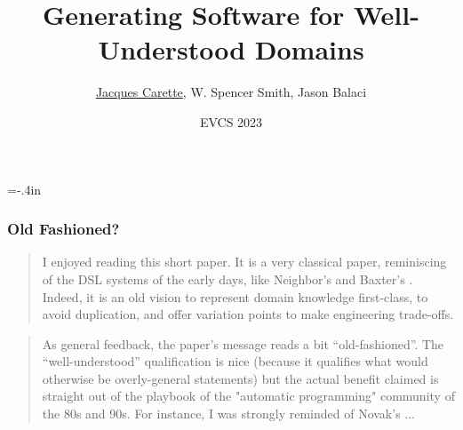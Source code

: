 \documentclass[usenames,dvipsnames,10pt]{beamer}
\title{\textbf{Generating Software for Well-Understood Domains}}
\author{\underline{Jacques Carette}, W. Spencer Smith, Jason Balaci}
\institute[McMaster University]
{
  Computing and Software Department\\
  McMaster University
}
\date[EVCS 2023] %
{EVCS 2023}
\newcommand{\name}[1]{{\color{blue}{#1}}}
\begin{document}
\hoffset=-.4in %
\begin{frame}[plain]


\titlepage

\end{frame}
\hoffset=0in %

\begin{frame}

\frametitle{Old Fashioned?}

\blockquote[][\\ \hfill-- \textbf{Referee 2}]{
\small{
I enjoyed reading this short paper. It is a very classical paper, reminiscing
of the DSL systems of the early days, like Neighbor's 
\name{Draco} and Baxter's \name{DMS}.
Indeed, it is an old vision to represent domain knowledge first-class, to avoid
duplication, and offer variation points to make engineering trade-offs.}
}

\vspace*{5mm}
\blockquote[][\hfill -- \textbf{Referee 3}]{
\small{
As general feedback, the paper's message reads a bit ``old-fashioned''. The
``well-understood'' qualification is nice (because it qualifies what would
otherwise be overly-general statements) but the actual benefit claimed is
straight out of the playbook of the "automatic programming" community of the
80s and 90s. For instance, I was strongly reminded of Novak's 
\name{GLisp}...}
}

\end{frame}
\end{document}
